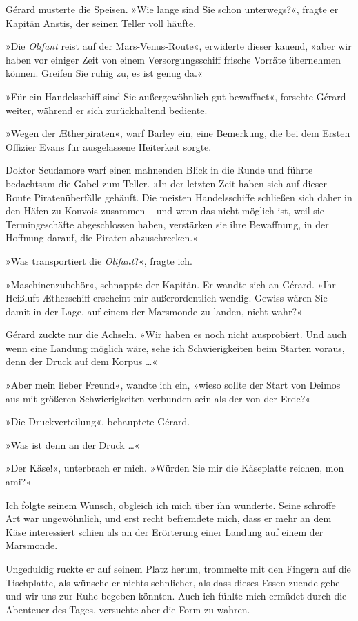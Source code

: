 Gérard musterte die Speisen. »Wie lange sind Sie schon unterwegs?«,
fragte er Kapitän Anstis, der seinen Teller voll häufte.

»Die \emph{Olifant} reist auf der Mars-Venus-Route«, erwiderte
dieser kauend, »aber wir haben vor einiger Zeit von einem
Versorgungsschiff frische Vorräte übernehmen können. Greifen Sie
ruhig zu, es ist genug da.«

»Für ein Handelsschiff sind Sie außergewöhnlich gut bewaffnet«,
forschte Gérard weiter, während er sich zurückhaltend bediente.

»Wegen der Ætherpiraten«, warf Barley ein, eine Bemerkung, die bei
dem Ersten Offizier Evans für ausgelassene Heiterkeit sorgte.

Doktor Scudamore warf einen mahnenden Blick in die Runde und führte
bedachtsam die Gabel zum Teller. »In der letzten Zeit haben sich
auf dieser Route Piratenüberfälle gehäuft. Die meisten
Handelsschiffe schließen sich daher in den Häfen zu Konvois
zusammen – und wenn das nicht möglich ist, weil sie Termingeschäfte
abgeschlossen haben, verstärken sie ihre Bewaffnung, in der
Hoffnung darauf, die Piraten abzuschrecken.«

»Was transportiert die \emph{Olifant}?«, fragte ich.

»Maschinenzubehör«, schnappte der Kapitän. Er wandte sich an
Gérard. »Ihr Heißluft-Ætherschiff erscheint mir außerordentlich
wendig. Gewiss wären Sie damit in der Lage, auf einem der Marsmonde
zu landen, nicht wahr?«

Gérard zuckte nur die Achseln. »Wir haben es noch nicht
ausprobiert. Und auch wenn eine Landung möglich wäre, sehe ich
Schwierigkeiten beim Starten voraus, denn der Druck auf dem Korpus
\ldots{}«

»Aber mein lieber Freund«, wandte ich ein, »wieso sollte der Start
von Deimos aus mit größeren Schwierigkeiten verbunden sein als der
von der Erde?«

»Die Druckverteilung«, behauptete Gérard.

»Was ist denn an der Druck \ldots{}«

»Der Käse!«, unterbrach er mich. »Würden Sie mir die Käseplatte
reichen, mon ami?«

Ich folgte seinem Wunsch, obgleich ich mich über ihn wunderte.
Seine schroffe Art war ungewöhnlich, und erst recht befremdete
mich, dass er mehr an dem Käse interessiert schien als an der
Erörterung einer Landung auf einem der Marsmonde.

Ungeduldig ruckte er auf seinem Platz herum, trommelte mit den
Fingern auf die Tischplatte, als wünsche er nichts sehnlicher, als
dass dieses Essen zuende gehe und wir uns zur Ruhe begeben könnten.
Auch ich fühlte mich ermüdet durch die Abenteuer des Tages,
versuchte aber die Form zu wahren.

